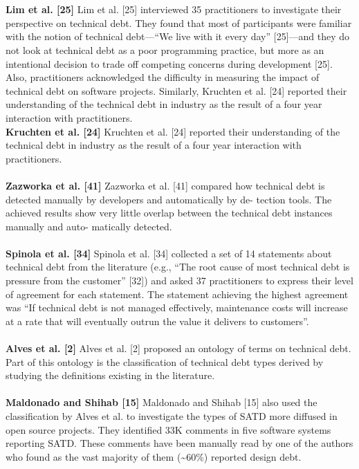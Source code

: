 \\
\\
\textbf{Lim et al. [25]}
Lim et al. [25] interviewed 35 practitioners to investigate their perspective on technical debt. They found that most of participants were familiar with the notion of technical debt—“We live with it every day” [25]—and they do not look at technical debt as a poor programming practice, but more as an intentional decision to trade off competing concerns during development [25]. Also, practitioners acknowledged the difficulty in measuring the impact of technical debt on software projects. Similarly, Kruchten et al. [24] reported their understanding of the technical debt in industry as the result of a four year interaction with practitioners.
\\
\textbf{Kruchten et al. [24]}
Kruchten et al. [24] reported their understanding of the technical debt in industry as the result of a four year interaction with practitioners.
\\
\\
\textbf{Zazworka et al. [41]}
Zazworka et al. [41] compared how technical debt is detected manually by developers and automatically by de- tection tools. The achieved results show very little overlap between the technical debt instances manually and auto- matically detected.
\\
\\
\textbf{Spinola et al. [34]}
Spinola et al. [34] collected a set of 14 statements about technical debt from the literature (e.g., “The root cause of most technical debt is pressure from the customer” [32]) and asked 37 practitioners to express their level of agreement for each statement. The statement achieving the highest agreement was “If technical debt is not managed effectively, maintenance costs will increase at a rate that will eventually outrun the value it delivers to customers”.
\\
\\
\textbf{Alves et al. [2]}
Alves et al. [2] proposed an ontology of terms on technical debt. Part of this ontology is the classification of technical debt types derived by studying the definitions existing in the literature. 
\\
\\
\textbf{Maldonado and Shihab [15]}
Maldonado and Shihab [15] also used the classification by Alves et al. to investigate the types of SATD more diffused in open source projects. They identified 33K comments in five software systems reporting SATD. These comments have been manually read by one of the authors who found as the vast majority of them (\textasciitilde60\%) reported design debt. 
